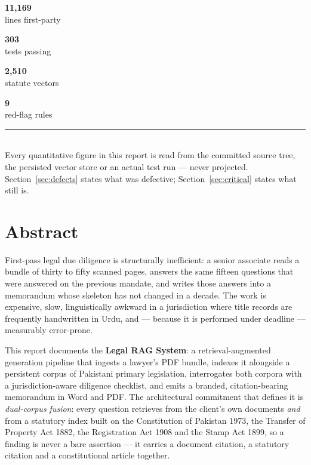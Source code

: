 \documentclass[11pt,a4paper]{article}
\newcommand{\metric}[3]{%
  \begin{minipage}[t]{0.235\linewidth}%
  \begin{tcolorbox}[width=\linewidth,height=1.85cm,valign=center,halign=center,
    colback=white,colframe=#3,boxrule=1pt,arc=3pt,left=1pt,right=1pt,top=1pt,bottom=1pt]
    {\fontsize{15}{15}\selectfont\bfseries\color{#3}#1}\\[2pt]
    {\scriptsize\color{slate}#2}
  \end{tcolorbox}%
  \end{minipage}}
\begin{document}
\begin{titlepage}
\vspace{0.75cm}

\begin{center}
\metric{11{,}169}{lines first-party}{navy}\hfill
\metric{303}{tests passing}{forest}\hfill
\metric{2{,}510}{statute vectors}{azure}\hfill
\metric{9}{red-flag rules}{riskred}
\end{center}

\vfill
\begin{center}
{\color{hairline}\rule{0.5\linewidth}{0.6pt}}\\[6pt]
{\footnotesize\color{slate}
Every quantitative figure in this report is read from the committed source tree, the
persisted vector store or an actual test run --- never projected.\\
Section~\ref{sec:defects} states what was defective; Section~\ref{sec:critical} states
what still is.}
\end{center}
\vspace{0.4cm}
\end{titlepage}

\section*{\color{navy}Abstract}
\vspace{-6pt}{\color{gold}\rule{\linewidth}{1.1pt}}\vspace{2pt}

\noindent
First-pass legal due diligence is structurally inefficient: a senior associate reads a
bundle of thirty to fifty scanned pages, answers the same fifteen questions that were
answered on the previous mandate, and writes those answers into a memorandum whose
skeleton has not changed in a decade. The work is expensive, slow, linguistically awkward
in a jurisdiction where title records are frequently handwritten in Urdu, and ---
because it is performed under deadline --- measurably error-prone.

This report documents the \textbf{Legal RAG System}: a retrieval-augmented generation
pipeline that ingests a lawyer's PDF bundle, indexes it alongside a persistent corpus of
Pakistani primary legislation, interrogates both corpora with a jurisdiction-aware
diligence checklist, and emits a branded, citation-bearing memorandum in Word and PDF.
The architectural commitment that defines it is \emph{dual-corpus fusion}: every question
retrieves from the client's own documents \emph{and} from a statutory index built on the
Constitution of Pakistan 1973, the Transfer of Property Act 1882, the Registration Act
1908 and the Stamp Act 1899, so a finding is never a bare assertion --- it carries a
document citation, a statutory citation and a constitutional article together.
\end{document}
